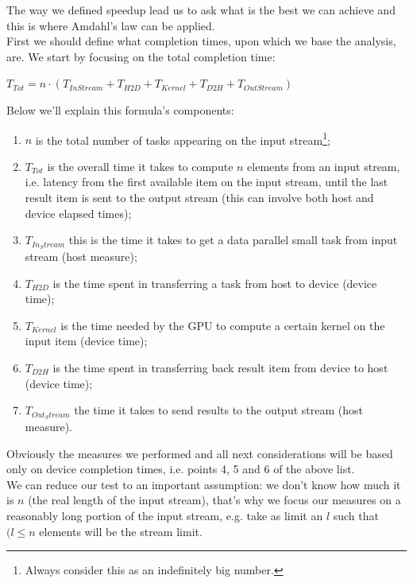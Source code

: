 The way we defined speedup lead us to ask what is the best we can achieve and this is where Amdahl's law can be applied.\\
First we should define what completion times, upon which we base the analysis, are. 
We start by focusing on the total completion time:
\begin{center}
	\(T_{Tot} = n \cdot (T_{In Stream} + T_{H2D} + T_{Kernel} + T_{D2H} +T_{Out Stream}) \)
\end{center}
Below we'll explain this formula's components:
\begin{enumerate}
	\item \(n\) is the total number of tasks appearing on the input stream\footnote{Always consider this as an indefinitely big number.};
	
	\item \(T_{Tot}\) is the overall time it takes to compute \(n\) elements from an input stream, i.e. latency from the first available item on the input stream, until the last result item is sent to the output stream (this can involve both host and device elapsed times);
	
	\item \(T_{In_Stream}\) this is the time it takes to get a \textendash data parallel small \textendash task from input stream (host measure);
	
	\item \(T_{H2D}\) is the time spent in transferring a task from host to device (device time);
	
	\item \(T_{Kernel}\) is the time needed by the GPU to compute a certain kernel on the input item (device time);
	
	\item \(T_{D2H}\) is the time spent in transferring back result item from device to host (device time);
	
	\item \(T_{Out_Stream}\) the time it takes to send results to the output stream (host measure).	
\end{enumerate}
Obviously the measures we performed and all next considerations will be based only on device completion times, i.e. points 4, 5 and 6 of the above list.\\
We can reduce our test to an important assumption: we don't know how much it is \(n\) (the real length of the input stream), that's why we focus our measures on a reasonably long portion of the input stream, e.g. take as limit an \(l\) such that \((l \leq n\) elements will be the stream limit.\\

